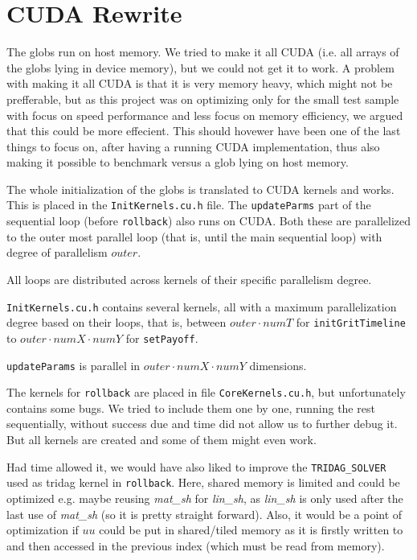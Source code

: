 \section{CUDA Rewrite}
The globs run on host memory. We tried to make it all CUDA (i.e. all arrays of the globs lying in device memory), but we could not get it to work. A problem with making it all CUDA is that it is very memory heavy, which might not be prefferable, but as this project was on optimizing only for the small test sample with focus on speed performance and less focus on memory efficiency, we argued that this could be more effecient. This should hovewer have been one of the last things to focus on, after having a running CUDA implementation, thus also making it possible to benchmark versus a glob lying on host memory.

The whole initialization of the globs is translated to CUDA kernels and works. This is placed in the \texttt{InitKernels.cu.h} file. The \texttt{updateParms} part of the sequential loop (before \texttt{rollback}) also runs on CUDA. Both these are parallelized to the outer most parallel loop (that is, until the main sequential loop) with degree of parallelism $outer$. 

All loops are distributed across kernels of their specific parallelism degree.

\texttt{InitKernels.cu.h} contains several kernels, all with a maximum parallelization degree based on their loops, that is, between $outer\cdot numT$ for \texttt{initGritTimeline} to $outer\cdot numX \cdot numY$ for \texttt{setPayoff}.

\texttt{updateParams} is parallel in $outer\cdot numX \cdot numY$ dimensions. 

The kernels for \texttt{rollback} are placed in file \texttt{CoreKernels.cu.h}, but unfortunately contains some bugs. We tried to include them one by one, running the rest sequentially, without success due and time did not allow us to further debug it. But all kernels are created and some of them might even work.

Had time allowed it, we would have also liked to improve the \texttt{TRIDAG\_SOLVER} used as tridag kernel in \texttt{rollback}. Here, shared memory is limited and could be optimized e.g. maybe reusing \textit{mat\_sh} for \textit{lin\_sh}, as \textit{lin\_sh} is only used after the last use of \textit{mat\_sh} (so it is pretty straight forward). Also, it would be a point of optimization if $uu$ could be put in shared/tiled memory as it is firstly written to and then accessed in the previous index (which must be read from memory).